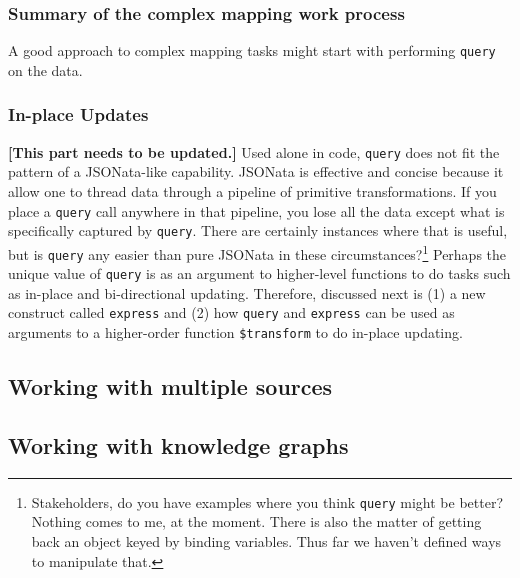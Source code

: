 \documentclass[9pt,letterpaper]{article}
\newcommand{\stt}[1]{\texttt{#1}}
\begin{document}
\subsubsection{Summary of the complex mapping work process}
A good approach to complex mapping tasks might start with performing \stt{query} on the data.


\subsubsection{In-place Updates}

\textbf{[This part needs to be updated.]} Used alone in code, \stt{query} does not fit the pattern of a JSONata-like capability.
JSONata is effective and concise because it allow one to thread data through a pipeline of primitive transformations.
If you place a \stt{query} call anywhere in that pipeline, you lose all the data except what is specifically captured by \stt{query}.
There are certainly instances where that is useful, but is \stt{query} any easier than pure JSONata in these circumstances?\footnote{Stakeholders, do you have
  examples where you think \stt{query} might be better?
  Nothing comes to me, at the moment.
  There is also the matter of getting back an object keyed by binding variables.
  Thus far we haven't defined ways to manipulate that.}
Perhaps the unique value of \stt{query} is as an argument to higher-level functions to do tasks such as in-place and bi-directional updating.
Therefore, discussed next is (1) a new construct called \stt{express} and (2) how \stt{query} and \stt{express} can be used as arguments to a higher-order function \stt{\$transform} to do in-place updating.

\subsection{Working with multiple sources}

\subsection{Working with knowledge graphs}
\end{document}
